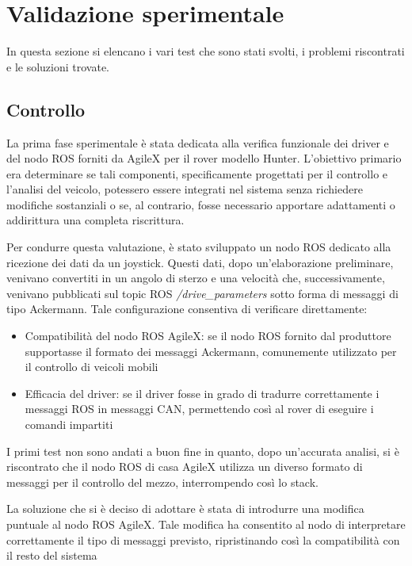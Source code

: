 \section{Validazione sperimentale}
In questa sezione si elencano i vari test che sono stati svolti, i problemi riscontrati e le soluzioni trovate.

\subsection{Controllo}
La prima fase sperimentale è stata dedicata alla verifica funzionale dei driver e del nodo ROS forniti da AgileX per il rover modello Hunter. L'obiettivo primario era determinare se tali componenti, specificamente progettati per il controllo e l'analisi del veicolo, potessero essere integrati nel sistema senza richiedere modifiche sostanziali o se, al contrario, fosse necessario apportare adattamenti o addirittura una completa riscrittura.

\noindent Per condurre questa valutazione, è stato sviluppato un nodo ROS dedicato alla ricezione dei dati da un joystick. Questi dati, dopo un'elaborazione preliminare, venivano convertiti in un angolo di sterzo e una velocità che, successivamente, venivano pubblicati sul topic ROS \textit{/drive\_parameters} sotto forma di messaggi di tipo Ackermann. Tale configurazione consentiva di verificare direttamente:

\begin{itemize}
  \item Compatibilità del nodo ROS AgileX: se il nodo ROS fornito dal produttore supportasse il formato dei messaggi Ackermann, comunemente utilizzato per il controllo di veicoli mobili
  \item Efficacia del driver: se il driver fosse in grado di tradurre correttamente i messaggi ROS in messaggi CAN, permettendo così al rover di eseguire i comandi impartiti
\end{itemize}

\noindent I primi test non sono andati a buon fine in quanto, dopo un'accurata analisi, si è riscontrato che il nodo ROS di casa AgileX utilizza un diverso formato di messaggi per il controllo del mezzo, interrompendo così lo stack.

\noindent La soluzione che si è deciso di adottare è stata di introdurre una modifica puntuale al nodo ROS AgileX. Tale modifica ha consentito al nodo di interpretare correttamente il tipo di messaggi previsto, ripristinando così la compatibilità con il resto del sistema

